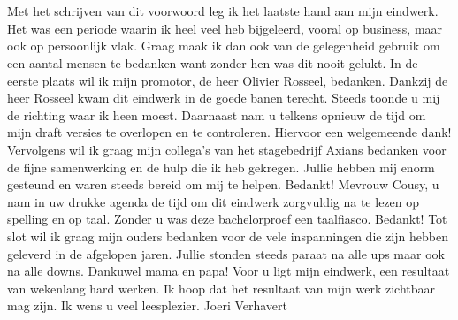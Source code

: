 
\chapter*{}
\label{ch:voorwoord}

Met het schrijven van dit voorwoord leg ik het laatste hand aan mijn eindwerk. Het was een periode waarin ik heel veel heb bijgeleerd, vooral op business, maar ook op persoonlijk vlak.  Graag maak ik dan ook van de gelegenheid gebruik om een aantal mensen te bedanken want zonder hen was dit nooit gelukt. 
\newline
\newline
In de eerste plaats wil ik mijn promotor, de heer Olivier Rosseel, bedanken. Dankzij de heer Rosseel kwam dit eindwerk in de goede banen terecht. Steeds toonde u mij de richting waar ik heen moest. Daarnaast nam u telkens opnieuw de tijd om mijn draft versies te overlopen en te controleren. Hiervoor een welgemeende dank!
\newline
\newline
Vervolgens wil ik graag mijn collega’s van het stagebedrijf Axians bedanken voor de fijne samenwerking en de hulp die ik heb gekregen. Jullie hebben mij enorm gesteund en waren steeds bereid om mij te helpen. Bedankt!
\newline
\newline
Mevrouw Cousy, u nam in uw drukke agenda de tijd om dit eindwerk zorgvuldig na te lezen op spelling en op taal. Zonder u was deze bachelorproef een taalfiasco. Bedankt!
\newline
\newline
Tot slot wil ik graag mijn ouders bedanken voor de vele inspanningen die zijn hebben geleverd in de afgelopen jaren. Jullie stonden steeds paraat na alle ups maar ook na alle downs. Dankuwel mama en papa!
\newline
\newline
Voor u ligt mijn eindwerk, een resultaat van wekenlang hard werken. Ik hoop dat het resultaat van mijn werk zichtbaar mag zijn. 
\newline
\newline
Ik wens u veel leesplezier.
\newline
Joeri Verhavert






